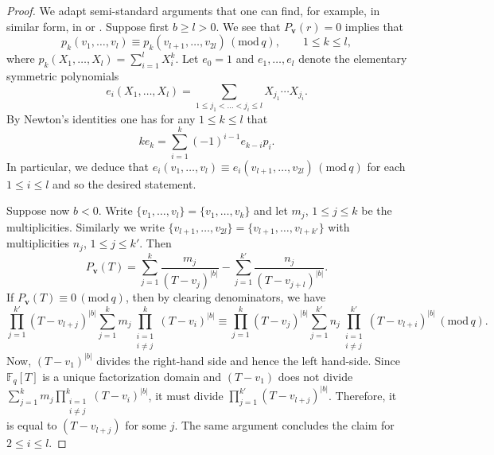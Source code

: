 \documentclass[12pt]{amsart}
\theoremstyle{plain}
\theoremstyle{definition}
\theoremstyle{remark}
\numberwithin{equation}{section}
\newcommand{\FF}{\mathbb{F}}
\newcommand{\mods}[1]{\,(\mathrm{mod}\,{#1})}
\renewcommand{\geq}{\geqslant}
\renewcommand{\leq}{\leqslant}
\begin{document}
\begin{proof}
We adapt semi-standard arguments that one can find, for example, in similar form, in \cite{ASENS_1998_4_31_1_93_0} or \cite{Pierce1}. Suppose first $b\geq l>0$. We see that $P_{\mathbf{v}}(r) = 0$ implies that \begin{equation*}
    p_k(v_1,\dots,v_l) \equiv  p_k(v_{l+1},\dots,v_{2l}) \mods{q}, \qquad 1\leq k \leq l,
\end{equation*} 
where $p_k(X_1,\dots,X_l) = \sum_{i=1}^l X_i^k$.
Let $e_0 =1$ and $e_1,\dots,e_l$ denote the elementary symmetric polynomials  
\[ e_i(X_1,\dots,X_l) = \sum_{1\leq j_1<\dots<j_i\leq l}X_{j_1}\cdots X_{j_i}.\]
By Newton's identities one has for any $1\leq k \leq l$ that
\[ ke_k = \sum_{i=1}^{k}(-1)^{i-1}e_{k-i}p_i.\]
In particular, we deduce that $e_i(v_1,\dots,v_l) \equiv  e_i(v_{l+1},\dots,v_{2l}) \mods{q}$ for each $1\leq i\leq l$ and so the desired statement.

Suppose now $b<0$. Write $\{v_1,\dots,v_l\} = \{v_1,\dots,v_{k}\}$ and let $m_j$, $1\leq j \leq k$ be the multiplicities. Similarly we write $\{v_{l+1},\dots,v_{2l}\} = \{v_{l+1},\dots,v_{l+k'}\}$ with multiplicities $n_j$, $1\leq j\leq k'$. Then 
\[P_\mathbf{v}(T) = \sum_{j=1}^k\frac{m_j}{(T-v_j)^{\vert b \vert}} - \sum_{j=1}^{k'}\frac{n_j}{(T-v_{j+l})^{\vert b\vert}}. \]
 If $P_\mathbf{v}(T) \equiv 0 \mods{q}$, then by clearing denominators, we have 
\[ \prod_{j=1}^{k'}(T-v_{l+j})^{\vert b\vert} \sum_{j=1}^km_j\prod_{\substack{i=1\\i\neq j}}^k(T-v_i)^{\vert b\vert} \equiv \prod_{j=1}^k(T-v_{j})^{\vert b\vert}\sum_{j=1}^{k'}n_j\prod_{\substack{i=1\\i\neq j}}^{k'}(T-v_{l+i})^{\vert b\vert} \mods{q}. \]
Now, $(T-v_1)^{\vert{b}\vert}$ divides the right-hand side and hence the left hand-side. Since $\FF_q[T]$ is a unique factorization domain and $(T-v_1)$ does not divide $\sum_{j=1}^km_j\prod_{\substack{i=1\\i\neq j}}^k(T-v_i)^{\vert b \vert}$, it must divide $\prod_{j=1}^{k'}(T-v_{l+j})^{\vert b\vert}$. Therefore, it is equal to $(T-v_{l+j})$ for some $j$. The same argument concludes the claim for $2\leq i \leq l$. 
\end{proof}
\end{document}
